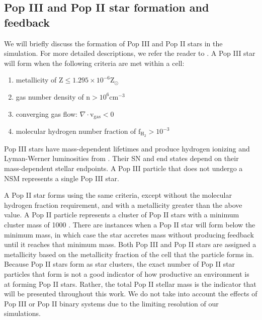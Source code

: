\documentclass[fleqn,usenatbib]{mnras}
\begin{document}
\subsection{Pop III and Pop II star formation and feedback} \label{sec:star_formation}
We will briefly discuss the formation of Pop III and Pop II stars in the simulation. For more detailed descriptions, we refer the reader to \citet{Skinner20}. A Pop III star will form when the following criteria are met within a cell: 
\begin{enumerate}
	\item metallicity of $\mathrm{Z} \leq 1.295 \times 10^{-6} \mathrm{Z}_{\odot}$
	\item gas number density of $\mathrm{n} > 10^{6} \mathrm{cm}^{-3}$
	\item converging gas flow: $\nabla \cdot \mathrm{v}_{\mathrm{gas}} < 0$
	\item molecular hydrogen number fraction of $\mathrm{f}_{\mathrm{H}_{2}} > 10^{-3}$
\end{enumerate}
Pop III stars have mass-dependent lifetimes and produce hydrogen ionizing and Lyman-Werner luminosities from \citet{Schaerer02}. Their SN and end states depend on their mass-dependent stellar endpoints. A Pop III particle that does not undergo a NSM represents a single Pop III star. 

A Pop II star forms using the same criteria, except without the molecular hydrogen fraction requirement, and with a metallicity greater than the above value. A Pop II particle represents a cluster of Pop II stars with a minimum cluster mass of 1000 \Ms. There are instances when a Pop II star will form below the minimum mass, in which case the star accretes mass without producing feedback until it reaches that minimum mass. Both Pop III and Pop II stars are assigned a metallicity based on the metallicity fraction of the cell that the particle forms in. Because Pop II stars form as star clusters, the exact number of Pop II star particles that form is not a good indicator of how productive an environment is at forming Pop II stars. Rather, the total Pop II stellar mass is the indicator that will be presented throughout this work. We do not take into account the effects of Pop III or Pop II binary systems due to the limiting resolution of our simulations.


\end{document}
